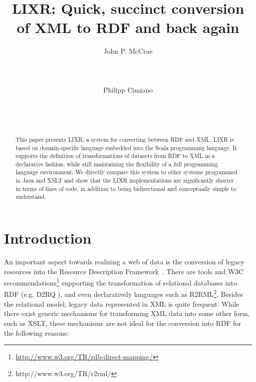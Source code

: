\documentclass{acm_proc_article-sp}
\begin{document}
\title{LIXR: Quick, succinct conversion of XML to RDF and back again}


\author{
\alignauthor
John P. McCrae\\
       \\
       \\
       \\
\alignauthor
Philipp Cimiano\\
       \\
       \\
       \\
}

\maketitle
\begin{abstract}
This paper presents LIXR, a system for converting between RDF and XML. LIXR is based on   domain-specific language embedded into the Scala programming language.
It supports the definition of transformations of 
datasets from RDF to XML in a declarative fashion, while still maintaining the flexibility of a full
programming language environment. We directly compare this system to other systems
programmed in Java and XSLT and show that the LIXR implementations are significantly
shorter in terms of lines of code, in addition to being bidirectional and conceptually simple to understand.

\end{abstract}




\section{Introduction}

An important aspect towards realizing a web of data is the conversion of legacy resources into the 
Resource Description Framework~\cite[RDF]{cyganiak2014rdf}. There are tools and W3C recommendations\footnote{\url{http://www.w3.org/TR/rdb-direct-mapping/}} supporting the transformation of relational databases into RDF (e.g. D2RQ \cite{d2rq}), and even declaratively languages such as R2RML\footnote{http://www.w3.org/TR/r2rml/}. Besides the relational model, legacy data represented in XML is quite frequent. While there exist generic mechanisms for transforming XML data into some other form, such as XSLT, these mechanisms are not ideal for the conversion into RDF for the following reasons:
\end{document}
